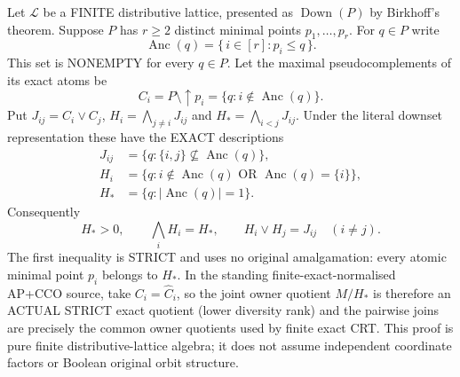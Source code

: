 \begin{lemma}
\label{lem:acf-joint-owner-minimum-ancestors}
Let $\mathcal L$ be a FINITE
distributive lattice, presented as
$\operatorname{Down}(P)$ by
Birkhoff's theorem. Suppose
$P$ has $r\ge2$ distinct
minimal points $p_1,\dots,p_r$.
For $q\in P$ write
\[
    \operatorname{Anc}(q)=
         \{\,i\in[r]:p_i\le q\,\}.
\]
This set is NONEMPTY for every
$q\in P$. Let the maximal
pseudocomplements of its exact
atoms be
\[
 C_i=P\setminus\uparrow p_i
       =\{q:i\notin\operatorname{Anc}(q)\}.
\]
Put $J_{ij}=C_i\vee C_j$,
$H_i=\bigwedge_{j\ne i}J_{ij}$
and $H_*=\bigwedge_{i<j}J_{ij}$.
Under the literal downset
representation these have
the EXACT descriptions
\[
\begin{aligned}
 J_{ij}
    &=\{q:\{i,j\}\not\subseteq
                     \operatorname{Anc}(q)\},\\
 H_i
    &=\{q:i\notin\operatorname{Anc}(q)
                 \text{ OR }
                 \operatorname{Anc}(q)=\{i\}\},\\
 H_*
    &=\{q:|\operatorname{Anc}(q)|=1\}.
\end{aligned}
\tag{MO}\label{eq:acf-joint-owner-minimum-ancestors}
\]
Consequently
\[
 H_*>0,\qquad
 \bigwedge_iH_i=H_*,
 \qquad H_i\vee H_j=J_{ij}
                     \quad(i\ne j).
\tag{MOR}\label{eq:acf-joint-owner-relations}
\]
The first inequality is STRICT
and uses no original
amalgamation: every atomic
minimal point $p_i$ belongs
to $H_*$. In the standing
finite-exact-normalised AP+CCO
source, take $C_i=\widehat C_i$,
so the joint owner quotient
$M/H_*$ is therefore an ACTUAL
STRICT exact quotient (lower
diversity rank) and the
pairwise joins are precisely
the common owner quotients
used by finite exact CRT.
This proof is pure finite
distributive-lattice algebra;
it does not assume independent
coordinate factors or Boolean
original orbit structure.
\end{lemma}
